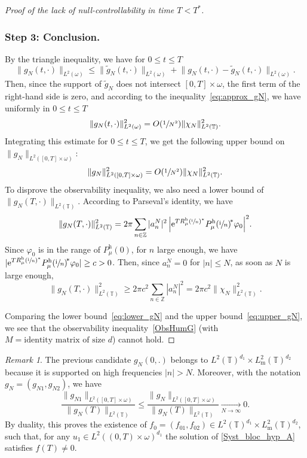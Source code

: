 \documentclass[10pt]{amsart}
\theoremstyle{plain}
\theoremstyle{definition}
\theoremstyle{remark}
\newtheorem{remark}[theorem]{Remark}
\let\bigO O
\newcommand{\set}{\mathbb}
\newcommand{\T}{\set{T}}
\newcommand{\h}{{\mathrm h}}
\newcommand{\m}{{\mathrm m}}
\newcommand{\eu}{\mathrm e}
\newcommand{\iu}{\mathrm i}
\let\originalleft\left
\let\originalright\right
\renewcommand{\left}{\mathopen{}\mathclose\bgroup\originalleft}
\renewcommand{\right}{\aftergroup\egroup\originalright}
\newcommand{\iun}{\left(\sfrac{\iu}{n}\right)}
\begin{document}
\begin{proof}[Proof of the lack of null-controllability in time $T<T^*$]
\subsubsection*{Step 3: Conclusion.}
By the triangle inequality, we have for $0\leq t\leq T$
\[
\lVert g_N(t,\cdot)\rVert_{L^2(\omega)} \leq \lVert \widetilde g_N(t,\cdot)\rVert_{L^2(\omega)}
+\lVert g_N(t,\cdot)-\widetilde g_N(t,\cdot)\rVert_{L^2(\omega)}.
\]
Then, since the support of $\widetilde g_N$ does not intersect $[0,T]\times \omega$, the first term of the right-hand side is zero, and according to the inequality~\eqref{eq:approx_gN}, we have uniformly in $0\leq t\leq T$
\[
\lVert g_N(t,\cdot)\rVert_{L^2(\omega)}^2 =
\bigO\left(\sfrac 1{N^2}\right)\lVert\chi_N\rVert_{L^2(\set T)}^2.
\]
Integrating this estimate for $0\leq t\leq T$, we get the following upper bound on $\lVert g_N\rVert_{L^2([0,T]\times\omega)}$:
\begin{equation}
\label{eq:upper_gN}
\lVert g_N\rVert_{L^2([0,T]\times \omega)}^2 =
\bigO\left(\sfrac 1{N^2}\right)\lVert\chi_N\rVert_{L^2(\set T)}^2.
\end{equation}
To disprove the observability inequality, we also need a lower bound of $\| g_N(T,\cdot) \|_{L^2(\T)}$. According to Parseval's identity, we have
\[
\lVert g_N(T,\cdot)\rVert_{L^2(\set T)}^2
= 2\pi\sum_{n\in \set Z} |a_n^N|^2\,\left| \eu^{TR_\mu^\h\iun^* } P_\mu^\h\iun^{\!*} \varphi_0\right|^2.
\]
Since $\varphi_0$ is in the range of $P_\mu^\h(0)$, for $n$ large enough, we have $|\eu^{TR_\mu^\h\iun^* } P_\mu^\h\iun^{\!*}\varphi_0| \geq c>0$. Then, since $a_n^N = 0$ for $|n|\leq N$, as soon as $N$ is large enough,
\begin{equation}
\label{eq:lower_gN}
\lVert g_N(T,\cdot)\rVert_{L^2(\set T)}^2
\geq 2\pi c^2\sum_{n\in \set Z} |a_n^N|^2 = 2\pi c^2\lVert \chi_N\rVert_{L^2(\set T)}^2.
\end{equation}

Comparing the lower bound~\eqref{eq:lower_gN} and the upper bound~\eqref{eq:upper_gN}, we see that the observability inequality~\eqref{ObsHumG} (with $M = \text{identity matrix of size } d$) cannot hold.
\end{proof}

\begin{remark} \label{Rk_moy0}
The previous candidate $g_N(0,.)$ belongs to $L^2(\T)^{d_1} \times L^2_\m(\T)^{d_2}$ because it is supported on high frequencies $|n|>N$.
Moreover, with the notation $g_N=(g_{N1},g_{N2})$, we have
$$\frac{\lVert g_{N1}\rVert_{L^2([0,T]\times \omega)}}{\lVert g_N(T)\rVert_{L^2(\set T)}}
\leqslant
\frac{\lVert g_{N}\rVert_{L^2([0,T]\times \omega)}}{\lVert g_N(T)\rVert_{L^2(\set T)}}
\underset{N \to \infty}{\longrightarrow} 0.$$
By duality, this proves the existence of
$f_0=(f_{01},f_{02})\in L^2(\T)^{d_1} \times L^2_\m(\T)^{d_2}$, such that, for any $u_1 \in L^2((0,T)\times\omega)^{d_1}$ the solution of \eqref{Syst_bloc_hyp_A} satisfies $f(T) \neq 0$.
\end{remark}
\end{document}
